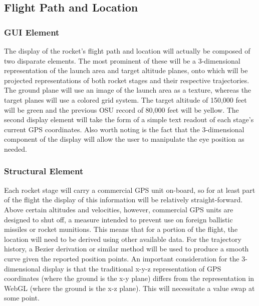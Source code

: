 \documentclass[journal,10pt,onecolumn,compsoc]{IEEEtran}
\begin{document}
	\subsection{Flight Path and Location}

		\subsubsection{GUI Element}
			The display of the rocket's flight path and location will actually be composed of two disparate elements.
			The most prominent of these will be a 3-dimensional representation of the launch area and target altitude planes, onto which will be projected representations of both rocket stages and their respective trajectories.
			The ground plane will use an image of the launch area as a texture, whereas the target planes will use a colored grid system.
			The target altitude of 150,000 feet will be green and the previous OSU record of 80,000 feet will be yellow.
			The second display element will take the form of a simple text readout of each stage's current GPS coordinates.
			Also worth noting is the fact that the 3-dimensional component of the display will allow the user to manipulate the eye position as needed.
			
		\subsubsection{Structural Element}
			Each rocket stage will carry a commercial GPS unit on-board, so for at least part of the flight the display of this information will be relatively straight-forward.
			Above certain altitudes and velocities, however, commercial GPS units are designed to shut off, a measure intended to prevent use on foreign ballistic missiles or rocket munitions.
			This means that for a portion of the flight, the location will need to be derived using other available data.
			For the trajectory history, a Bezier derivation or similar method will be used to produce a smooth curve given the reported position points.
			An important consideration for the 3-dimensional display is that the traditional x-y-z representation of GPS coordinates (where the ground is the x-y plane) differs from the representation in WebGL (where the ground is the x-z plane).
			This will necessitate a value swap at some point.
\end{document}
